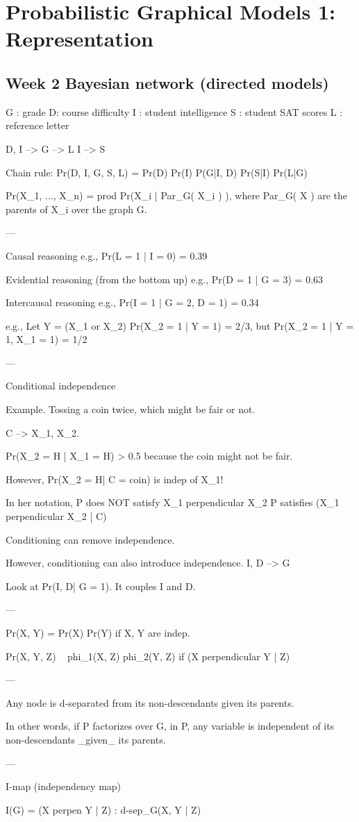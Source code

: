 \documentclass[12pt]{article}
\begin{document}
\section{Probabilistic Graphical Models 1: Representation}

\subsection{Week 2 Bayesian network (directed models)}

G : grade
D: course difficulty
I : student intelligence
S : student SAT scores
L : reference letter

D, I --> G --> L
I --> S

Chain rule:
Pr(D, I, G, S, L) = Pr(D) Pr(I) P(G|I, D) Pr(S|I) Pr(L|G)

Pr(X_1, ..., X_n) = prod Pr(X_i | Par_G( X_i ) ), where Par_G( X ) are the parents of X_i over the graph G.

---

Causal reasoning
e.g., Pr(L = 1 | I = 0) = 0.39

Evidential reasoning (from the bottom up)
e.g., Pr(D = 1 | G = 3) = 0.63

Intercausal reasoning
e.g., Pr(I = 1 | G = 2, D = 1) = 0.34

e.g., Let Y = (X_1 or X_2)
Pr(X_2 = 1 | Y = 1) = 2/3, but
Pr(X_2 = 1 | Y = 1, X_1 = 1) = 1/2

---

Conditional independence

Example.  Tossing a coin twice, which might be fair or not.

C --> X_1, X_2.

Pr(X_2 = H | X_1 = H) > 0.5 because the coin might not be fair.

However, Pr(X_2 = H| C = coin) is indep of X_1!

In her notation,
  P does NOT satisfy X_1 perpendicular X_2
  P satisfies (X_1 perpendicular X_2 | C)

Conditioning can remove independence.

However, conditioning can also introduce independence.
I, D --> G

Look at Pr(I, D| G = 1).  It couples I and D.

---

Pr(X, Y) = Pr(X) Pr(Y) if X, Y are indep.

Pr(X, Y, Z) ~ phi_1(X, Z) phi_2(Y, Z) if (X perpendicular Y | Z)

---

Any node is d-separated from its non-descendants given its parents.

In other words, if P factorizes over G, in P, any variable is independent of its non-descendants _given_ its parents.

---

I-map (independency map)

I(G) = { (X perpen Y | Z) : d-sep_G(X, Y | Z) }
\end{document}
